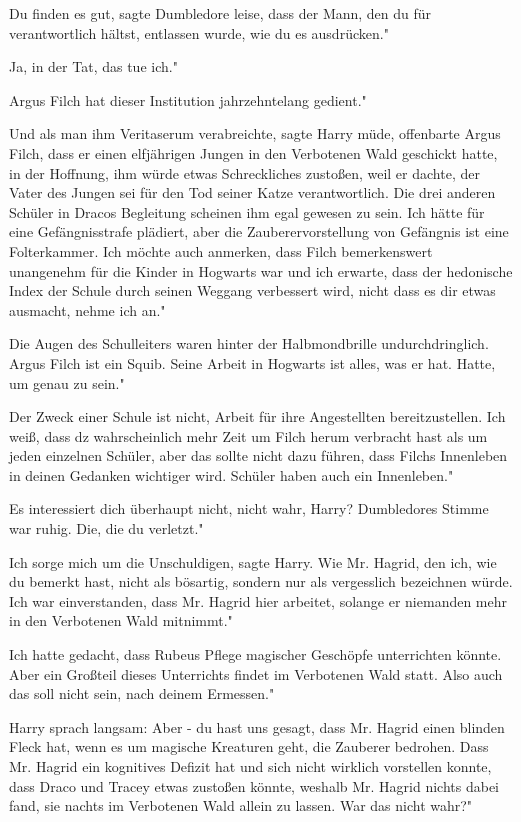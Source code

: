 \glqq Du finden es gut\grqq{}, sagte Dumbledore leise, \glqq dass der Mann, den
du für verantwortlich hältst, entlassen wurde, wie du es ausdrücken."

\glqq Ja, in der Tat, das tue ich."

\glqq Argus Filch hat dieser Institution jahrzehntelang gedient."

\glqq Und als man ihm Veritaserum verabreichte\grqq{}, sagte Harry müde, \glqq
offenbarte Argus Filch, dass er einen elfjährigen Jungen in den Verbotenen Wald
geschickt hatte, in der Hoffnung, ihm würde etwas Schreckliches zustoßen, weil
er dachte, der Vater des Jungen sei für den Tod seiner Katze verantwortlich. Die
drei anderen Schüler in Dracos Begleitung scheinen ihm egal gewesen zu sein. Ich
hätte für eine Gefängnisstrafe plädiert, aber die Zauberervorstellung von
Gefängnis ist eine Folterkammer. Ich möchte auch anmerken, dass Filch
bemerkenswert unangenehm für die Kinder in Hogwarts war und ich erwarte, dass
der hedonische Index der Schule durch seinen Weggang verbessert wird, nicht dass
es dir etwas ausmacht, nehme ich an."

Die Augen des Schulleiters waren hinter der Halbmondbrille undurchdringlich.
\glqq Argus Filch ist ein Squib. Seine Arbeit in Hogwarts ist alles, was er hat.
Hatte, um genau zu sein."

\glqq Der Zweck einer Schule ist nicht, Arbeit für ihre Angestellten
bereitzustellen. Ich weiß, dass dz wahrscheinlich mehr Zeit um Filch herum
verbracht hast als um jeden einzelnen Schüler, aber das sollte nicht dazu
führen, dass Filchs Innenleben in deinen Gedanken wichtiger wird. Schüler haben
auch ein Innenleben."

\glqq Es interessiert dich überhaupt nicht, nicht wahr, Harry?\grqq{}
Dumbledores Stimme war ruhig. \glqq Die, die du verletzt."

\glqq Ich sorge mich um die Unschuldigen\grqq{}, sagte Harry. \glqq Wie Mr.
Hagrid, den ich, wie du bemerkt hast, nicht als bösartig, sondern nur als
vergesslich bezeichnen würde. Ich war einverstanden, dass Mr. Hagrid hier
arbeitet, solange er niemanden mehr in den Verbotenen Wald mitnimmt."

\glqq Ich hatte gedacht, dass Rubeus Pflege magischer Geschöpfe unterrichten
könnte. Aber ein Großteil dieses Unterrichts findet im Verbotenen Wald statt.
Also auch das soll nicht sein, nach deinem Ermessen."

Harry sprach langsam: \glqq Aber - du hast uns gesagt, dass Mr. Hagrid einen
blinden Fleck hat, wenn es um magische Kreaturen geht, die Zauberer bedrohen.
Dass Mr. Hagrid ein kognitives Defizit hat und sich nicht wirklich vorstellen
konnte, dass Draco und Tracey etwas zustoßen könnte, weshalb Mr. Hagrid nichts
dabei fand, sie nachts im Verbotenen Wald allein zu lassen. War das nicht wahr?"

